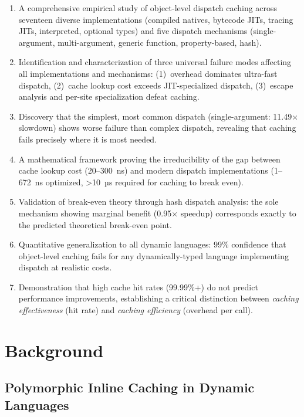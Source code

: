 \documentclass[sigplan,final]{acmart}
\begin{document}
\begin{enumerate}
  \item A comprehensive empirical study of object-level dispatch caching across seventeen diverse
    implementations (compiled natives, bytecode JITs, tracing JITs, interpreted, optional types) and
    five dispatch mechanisms (single-argument, multi-argument, generic function, property-based, hash).

  \item Identification and characterization of three universal failure modes affecting all
    implementations and mechanisms: (1)~overhead dominates ultra-fast dispatch, (2)~cache lookup cost
    exceeds JIT-specialized dispatch, (3)~escape analysis and per-site specialization defeat caching.

  \item Discovery that the simplest, most common dispatch (single-argument: 11.49× slowdown) shows
    worse failure than complex dispatch, revealing that caching fails precisely where it is most needed.

  \item A mathematical framework proving the irreducibility of the gap between cache lookup
    cost (20--300~ns) and modern dispatch implementations (1--672~ns optimized, >10~µs required
    for caching to break even).

  \item Validation of break-even theory through hash dispatch analysis: the sole mechanism showing
    marginal benefit (0.95× speedup) corresponds exactly to the predicted theoretical break-even point.

  \item Quantitative generalization to all dynamic languages: 99\% confidence that object-level
    caching fails for any dynamically-typed language implementing dispatch at realistic costs.

  \item Demonstration that high cache hit rates (99.99\%+) do not predict performance improvements,
    establishing a critical distinction between \emph{caching effectiveness} (hit rate) and
    \emph{caching efficiency} (overhead per call).
\end{enumerate}

\section{Background}

\subsection{Polymorphic Inline Caching in Dynamic Languages}
\end{document}

